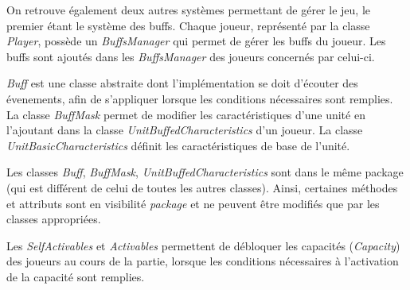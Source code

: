 
On retrouve également deux autres systèmes permettant de gérer le jeu,
le premier étant le système des buffs. Chaque joueur, représenté par la classe
\textit{Player}, possède un \textit{BuffsManager} qui permet de gérer les buffs du joueur.
Les buffs sont ajoutés dans les \textit{BuffsManager} des joueurs concernés par
celui-ci.

\textit{Buff} est une classe abstraite dont l'implémentation se doit d'écouter des évenements,
afin de s'appliquer lorsque les conditions nécessaires sont remplies.
La classe \textit{BuffMask} permet de modifier les caractéristiques d'une unité en
l'ajoutant dans la classe \textit{UnitBuffedCharacteristics} d'un joueur.
La classe \textit{UnitBasicCharacteristics} définit les caractéristiques de base de l'unité.

Les classes \textit{Buff}, \textit{BuffMask}, \textit{UnitBuffedCharacteristics} sont dans le même package (qui est
différent de celui de toutes les autres classes). Ainsi, certaines méthodes et attributs sont en visibilité \emph{package}
et ne peuvent être modifiés que par les classes appropriées.

Les \textit{SelfActivables} et \textit{Activables} permettent de débloquer les capacités (\textit{Capacity}) des
joueurs au cours de la partie, lorsque les conditions nécessaires à l'activation
de la capacité sont remplies.

